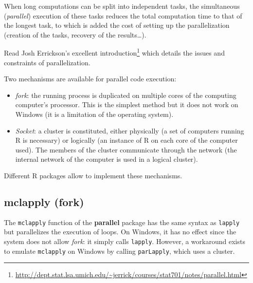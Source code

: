 \documentclass[
  12pt,
  american,
  a4paper,
  extrafontsizes,onecolumn,openright
  ]{memoir}
\providecommand{\tightlist}{%
  \setlength{\itemsep}{0pt}\setlength{\parskip}{0pt}}
\begin{document}
When long computations can be split into independent tasks, the simultaneous (\emph{parallel}) execution of these tasks reduces the total computation time to that of the longest task, to which is added the cost of setting up the parallelization (creation of the tasks, recovery of the results\ldots).

Read Josh Errickson's excellent introduction\footnote{\url{http://dept.stat.lsa.umich.edu/~jerrick/courses/stat701/notes/parallel.html}} which details the issues and constraints of parallelization.

Two mechanisms are available for parallel code execution:

\begin{itemize}
\tightlist
\item
  \emph{fork}: the running process is duplicated on multiple cores of the computing computer's processor.
  This is the simplest method but it does not work on Windows (it is a limitation of the operating system).
\item
  \emph{Socket}: a cluster is constituted, either physically (a set of computers running R is necessary) or logically (an instance of R on each core of the computer used).
  The members of the cluster communicate through the network (the internal network of the computer is used in a logical cluster).
\end{itemize}

Different R packages allow to implement these mechanisms.

\subsection{mclapply (fork)}\label{mclapply-fork}

The \texttt{mclapply} function of the \textbf{parallel} package has the same syntax as \texttt{lapply} but parallelizes the execution of loops.
On Windows, it has no effect since the system does not allow \emph{fork}: it simply calls \texttt{lapply}.
However, a workaround exists to emulate \texttt{mclapply} on Windows by calling \texttt{parLapply}, which uses a cluster.

\scriptsize
\end{document}
